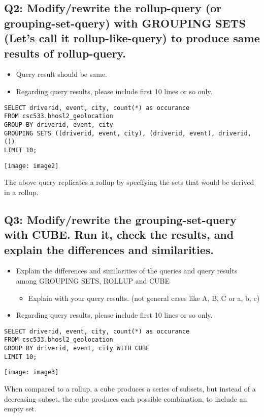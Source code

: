 \documentclass[]{article}
\begin{document}
\subsection*{Q2: Modify/rewrite the rollup-query (or grouping-set-query) with GROUPING SETS (Let’s call it rollup-like-query) to produce same results of rollup-query.}

\begin{itemize}[before=\itshape,font=\normalfont]
	\item Query result should be same.
	\item Regarding query results, please include first 10 lines or so only.
\end{itemize}

\begin{verbatim}
SELECT driverid, event, city, count(*) as occurance
FROM csc533.bhosl2_geolocation
GROUP BY driverid, event, city
GROUPING SETS ((driverid, event, city), (driverid, event), driverid, ())
LIMIT 10;
\end{verbatim}

\texttt{[image: image2]}

The above query replicates a rollup by specifying the sets that would be derived in a rollup.

\subsection*{Q3: Modify/rewrite the grouping-set-query with CUBE. Run it, check the results, and explain the differences and similarities.}

\begin{itemize}[before=\itshape,font=\normalfont]
	\item Explain the differences and similarities of the queries and query results among GROUPING SETS, ROLLUP and CUBE
	\begin{itemize}
		\item Explain with your query results. (not general cases like A, B, C or a, b, c)
	\end{itemize}
	\item Regarding query results, please include first 10 lines or so only.
\end{itemize}

\begin{verbatim}
SELECT driverid, event, city, count(*) as occurance
FROM csc533.bhosl2_geolocation
GROUP BY driverid, event, city WITH CUBE
LIMIT 10;
\end{verbatim}

\texttt{[image: image3]}

When compared to a rollup, a cube produces a series of subsets, but instead of a decreasing subset, the cube produces each possible combination, to include an empty set.
\end{document}
